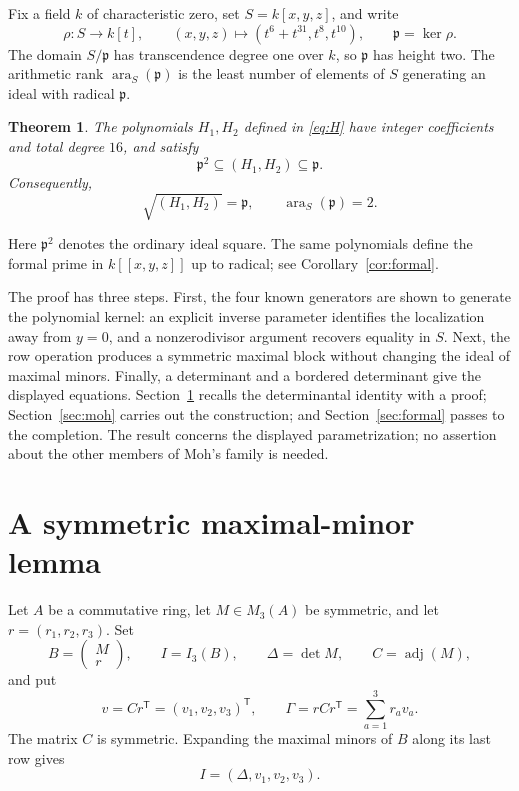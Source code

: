 \documentclass[11pt]{amsart}
\newtheorem{theorem}{Theorem}[section]
\theoremstyle{remark}
\DeclareMathOperator{\ara}{ara}
\DeclareMathOperator{\adj}{adj}
\begin{document}
Fix a field $k$ of characteristic zero, set $S=k[x,y,z]$, and write
\[
 \rho:S\longrightarrow k[t],\qquad
 (x,y,z)\longmapsto(t^6+t^{31},t^8,t^{10}),
 \qquad \mathfrak p=\ker\rho.
\]
The domain $S/\mathfrak p$ has transcendence degree one over $k$, so $\mathfrak p$ has height two. The arithmetic rank $\ara_S(\mathfrak p)$ is the least number of elements of $S$ generating an ideal with radical $\mathfrak p$.

\begin{theorem}\label{thm:main}
The polynomials $H_1,H_2$ defined in \eqref{eq:H} have integer coefficients and total degree $16$, and satisfy
\[
 \mathfrak p^2\subseteq(H_1,H_2)\subseteq\mathfrak p.
\]
Consequently,
\[
 \sqrt{(H_1,H_2)}=\mathfrak p,
 \qquad \ara_S(\mathfrak p)=2.
\]
\end{theorem}

Here $\mathfrak p^2$ denotes the ordinary ideal square. The same polynomials define the formal prime in $k[[x,y,z]]$ up to radical; see Corollary~\ref{cor:formal}.

The proof has three steps. First, the four known generators are shown to generate the polynomial kernel: an explicit inverse parameter identifies the localization away from $y=0$, and a nonzerodivisor argument recovers equality in $S$. Next, the row operation produces a symmetric maximal block without changing the ideal of maximal minors. Finally, a determinant and a bordered determinant give the displayed equations. Section~\ref{sec:symmetric} recalls the determinantal identity with a proof; Section~\ref{sec:moh} carries out the construction; and Section~\ref{sec:formal} passes to the completion. The result concerns the displayed parametrization; no assertion about the other members of Moh's family is needed.

\section{A symmetric maximal-minor lemma}\label{sec:symmetric}

Let $A$ be a commutative ring, let $M\in M_3(A)$ be symmetric, and let $r=(r_1,r_2,r_3)$. Set
\[
 B=\begin{pmatrix}M\\r\end{pmatrix},\qquad
 I=I_3(B),\qquad
 \Delta=\det M,\qquad C=\adj(M),
\]
and put
\[
 v=Cr^{\mathsf T}=(v_1,v_2,v_3)^{\mathsf T},
 \qquad \Gamma=rCr^{\mathsf T}=\sum_{a=1}^3 r_av_a.
\]
The matrix $C$ is symmetric. Expanding the maximal minors of $B$ along its last row gives
\[
 I=(\Delta,v_1,v_2,v_3).
\]
\end{document}
